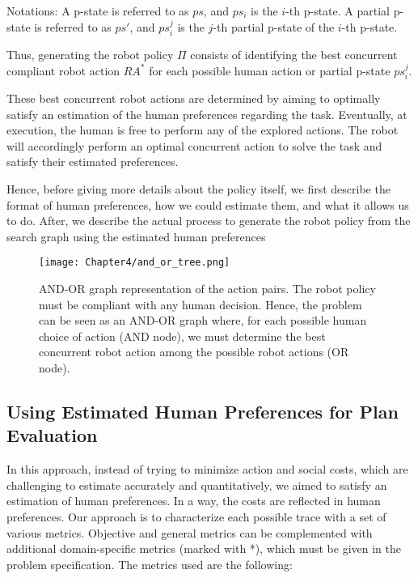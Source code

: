 Notations: A p-state is referred to as $ps$, and $ps_i$ is the $i$-th p-state. A partial p-state is referred to as $ps'$, and $ps_i^j$ is the $j$-th partial p-state of the $i$-th p-state.

Thus, generating the robot policy $\Pi$ consists of identifying the best concurrent compliant robot action $RA^*$ for each possible human action or partial p-state $ps_i^j$.

These best concurrent robot actions are determined by aiming to optimally satisfy an estimation of the human preferences regarding the task. Eventually, at execution, the human is free to perform any of the explored actions. The robot will accordingly perform an optimal concurrent action to solve the task and satisfy their estimated preferences.

Hence, before giving more details about the policy itself, we first describe the format of human preferences, how we could estimate them, and what it allows us to do. After, we describe the actual process to generate the robot policy from the search graph using the estimated human preferences


\begin{figure}
    \texttt{[image: Chapter4/and\_or\_tree.png]}
    \caption{AND-OR graph representation of the action pairs. 
    The robot policy must be compliant with any human decision. Hence, the problem can be seen as an AND-OR graph where, for each possible human choice of action (AND node), we must determine the best concurrent robot action among the possible robot actions (OR node).
    }
    \label{fig:and_or}
\end{figure}


    \subsection{Using Estimated Human Preferences for Plan Evaluation}

In this approach, instead of trying to minimize action and social costs, which are challenging to estimate accurately and quantitatively, we aimed to satisfy an estimation of human preferences. In a way, the costs are reflected in human preferences. Our approach is to characterize each possible trace with a set of various metrics. Objective and general metrics can be complemented with additional domain-specific metrics (marked with *), which must be given in the problem specification. The metrics used are the following:

